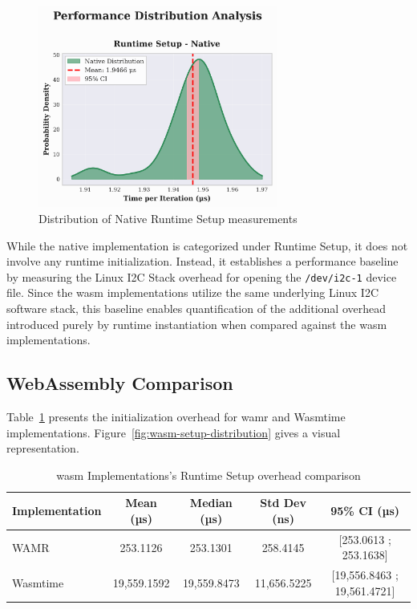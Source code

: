 \begin{figure}[h]
    \centering
    \includegraphics[width=0.7\textwidth]{images/native-setup-distribution}
    \caption{Distribution of Native Runtime Setup measurements}
    \label{fig:native-setup-distribution}
\end{figure}

While the native implementation is categorized under Runtime Setup, it does not involve any runtime initialization. Instead, it establishes a performance baseline by measuring the Linux I2C Stack overhead for opening the \texttt{/dev/i2c-1} device file. Since the \acrshort{wasm} implementations utilize the same underlying Linux I2C software stack, this baseline enables quantification of the additional overhead introduced purely by runtime instantiation when compared against the \acrshort{wasm} implementations.

\subsection{WebAssembly Comparison}
\label{subsec:eval-setup-wasm}

Table~\ref{tab:wasm-setup} presents the initialization overhead for \acrshort{wamr} and Wasmtime implementations. Figure~\ref{fig:wasm-setup-distribution} gives a visual representation.

\begin{table}[h]
    \centering
    \caption{\acrshort{wasm} Implementations's Runtime Setup overhead comparison}
    \label{tab:wasm-setup}
    \begin{tabular}{lcccc}
        \toprule
        \textbf{Implementation} & \textbf{Mean (µs)} & \textbf{Median (µs)} & \textbf{Std Dev (ns)} & \textbf{95\% CI (µs)} \\
        \midrule
        WAMR        & 253.1126 & 253.1301 & 258.4145 & [253.0613 ; 253.1638] \\
        Wasmtime    & 19,559.1592 & 19,559.8473 & 11,656.5225 & [19,556.8463 ; 19,561.4721] \\
        \bottomrule
    \end{tabular}
\end{table}

